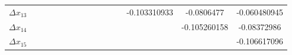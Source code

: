 \documentclass[a4paper]{article}
\begin{document}
\begin{CJK*}{GBK}{song}
\begin{center}
\begin{table*}[!htbp]
{\begin{threeparttable}[!htbp]
\begin{tabular}{ccccc ccccc ccccc}
$\Delta x_{13}$	&		&		&		&		&		&		&		&		&		&		&		&	-0.103310933	&	-0.0806477	&	-0.060480945	\\
$\Delta x_{14}$	&		&		&		&		&		&		&		&		&		&		&		&		&	-0.105260158	&	-0.08372986	\\
$\Delta x_{15}$	&		&		&		&		&		&		&		&		&		&		&		&		&		&	-0.106617096	\\
\bottomrule
\end{tabular}
\end{threeparttable}}%
\end{table*}
\end{center}

\begin{center}
\begin{table*}[t]
\end{table*}
\end{center}
\end{CJK*}
\end{document}

